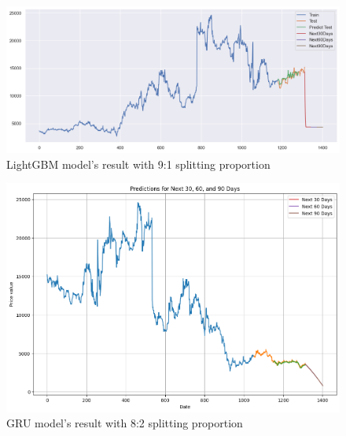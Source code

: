 \documentclass{ieeeojies}
\begin{document}
\begin{figure}[H]
  \centering
  \begin{minipage}{0.8\linewidth}
    \centering
    \includegraphics[width=\linewidth]{bibliography/Figure/AMV_LightGBM_91.png}
    \caption{LightGBM model's result with 9:1 splitting proportion}
    \label{fig8}
  \end{minipage}
\end{figure}

\begin{figure}[H]
  \centering
  \begin{minipage}{0.8\linewidth}
    \centering
    \includegraphics[width=\linewidth]{bibliography/Figure/AMV_GRU.png}
    \caption{GRU model's result with 8:2 splitting proportion}
    \label{fig8}
  \end{minipage}
\end{figure}
\end{document}
